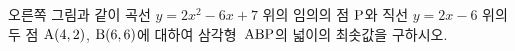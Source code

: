 \noindent\begin{minipage}[t]{0.58\linewidth}\vspace{0pt}\raggedright 오른쪽 그림과 같이 곡선 $y=2x^2-6x+7$ 위의 임의의 점 $\mathrm{P}$와 직선 $y=2x-6$ 위의 두 점 $\mathrm{A}(4{,}\mkern3mu\mathopen{}2)$, $\mathrm{B}(6{,}\mkern3mu\mathopen{}6)$에 대하여 삼각형~$\mathrm{ABP}$의 넓이의 최솟값을 구하시오.\end{minipage}\hfill\begin{minipage}[t]{0.4\linewidth}\vspace{0pt}\centering \resizebox{\ifdim\width>\linewidth\linewidth\else\width\fi}{!}{}\end{minipage}\par
